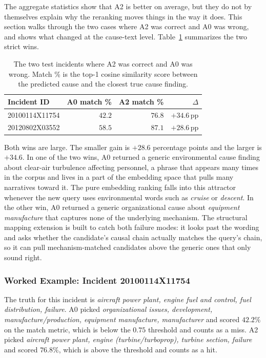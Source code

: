 \documentclass[11pt]{article}
\begin{document}
The aggregate statistics show that A2 is better on average, but they do not by themselves explain why the reranking moves things in the way it does. This section walks through the two cases where A2 was correct and A0 was wrong, and shows what changed at the cause-text level. Table~\ref{tab:wins} summarizes the two strict wins.

\begin{table}[h]
\centering
\caption{The two test incidents where A2 was correct and A0 was wrong. Match \% is the top-1 cosine similarity score between the predicted cause and the closest true cause finding.}
\label{tab:wins}
\begin{tabular}{lrrr}
\toprule
Incident ID & A0 match \% & A2 match \% & $\Delta$ \\
\midrule
20100114X11754 & $42.2$ & $76.8$ & $+34.6\,\text{pp}$ \\
20120802X03552 & $58.5$ & $87.1$ & $+28.6\,\text{pp}$ \\
\bottomrule
\end{tabular}
\end{table}

Both wins are large. The smaller gain is $+28.6$ percentage points and the larger is $+34.6$. In one of the two wins, A0 returned a generic environmental cause finding about clear-air turbulence affecting personnel, a phrase that appears many times in the corpus and lives in a part of the embedding space that pulls many narratives toward it. The pure embedding ranking falls into this attractor whenever the new query uses environmental words such as \emph{cruise} or \emph{descent}. In the other win, A0 returned a generic organizational cause about \emph{equipment manufacture} that captures none of the underlying mechanism. The structural mapping extension is built to catch both failure modes: it looks past the wording and asks whether the candidate's causal chain actually matches the query's chain, so it can pull mechanism-matched candidates above the generic ones that only sound right.

\subsubsection{Worked Example: Incident 20100114X11754}
\label{sec:verify_phase3:wins:fuel}

The truth for this incident is \emph{aircraft power plant, engine fuel and control, fuel distribution, failure}. A0 picked \emph{organizational issues, development, manufacture/production, equipment manufacture, manufacturer} and scored $42.2\%$ on the match metric, which is below the $0.75$ threshold and counts as a miss. A2 picked \emph{aircraft power plant, engine (turbine/turboprop), turbine section, failure} and scored $76.8\%$, which is above the threshold and counts as a hit.
\end{document}
